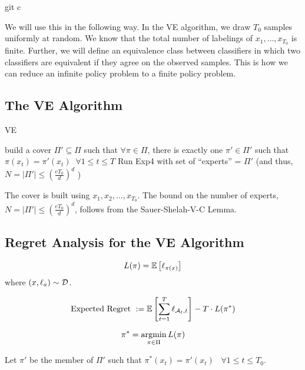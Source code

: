 git c\documentclass[11pt]{article}
\begin{document}
We will use this in the following way. In the VE algorithm, we draw $T_0$ samples uniformly at random. We know that the total number of labelings of $x_1,\ldots,x_{T_0}$ is finite. Further, we will define an equivalence class between classifiers in which two classifiers are equivalent if they agree on the observed samples. This is how we can reduce an infinite policy problem to a finite policy problem. 


\subsection{The VE Algorithm}

\begin{algorithm}
\caption{VE}
\label{alg: VE}
\begin{algorithmic}
\ENDFOR
\STATE build a cover  $\Pi' \subseteq \Pi$ such that $\forall \pi \in \Pi$, there is exactly one $\pi' \in \Pi'$ such that $\pi(x_t) = \pi'(x_t)\;\;\forall 1 \le t \le T$
\STATE Run Exp4 with set of ``experts'' = $\Pi'$ (and thus,  $N = |\Pi'| \le (\frac{eT_0}{d})^d$ )
\ENDFOR
\end{algorithmic}
\end{algorithm}
The cover is built using $x_1,x_2,\ldots,x_{T_0}$. The bound on the number of experts, $N= |\Pi'| \le (\frac{eT_0}{d})^d$, follows from the Sauer-Shelah-V-C Lemma. 

%
%
\subsection{Regret Analysis for the VE Algorithm}
\begin{equation}
L(\pi) = \mathbb{E}\left[ \ell_{\pi(x)} \right]
\end{equation}
where ${(x,\ell_a)\sim \mathcal{D}}$.

\begin{equation}
\text{Expected Regret }:= \mathbb{E}\left[ \sum_{t=1}^T\ell_{\mathcal{A}_t,t} \right] - T\cdot L(\pi^*)
\end{equation}

$$\pi^*=\operatorname*{argmin}_{\pi\in\Pi} L(\pi)$$

Let $\pi'$ be the member of $\Pi'$ such that $\pi^*(x_t) = \pi'(x_t)\;\;\;\forall 1\le t \le T_0$.
\end{document}
